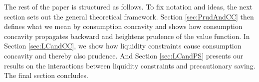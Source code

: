 \documentclass[titlepage]{\econtex}
\begin{document}
  The rest of the paper is structured as follows. To fix notation and ideas, the next section sets out the general theoretical framework. Section \ref{sec:PrudAndCC} then defines what we mean by consumption concavity and shows how consumption concavity propagates backward and heightens prudence of the value function. In Section \ref{sec:LCandCC}, we show how liquidity constraints cause consumption concavity and thereby also prudence. And Section \ref{sec:LCandPS} presents our results on the interactions between liquidity constraints and precautionary saving. The final section concludes. 





\clearpage\pagebreak

\hypertarget{SetupIntro}{}
\end{document}
